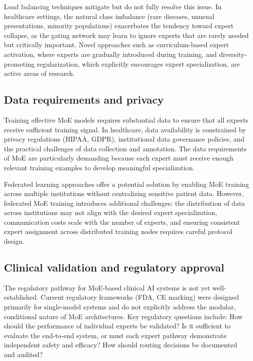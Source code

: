 Load balancing techniques \cite{fedus2022switch} mitigate but do not fully resolve this issue. In healthcare settings, the natural class imbalance (rare diseases, unusual presentations, minority populations) exacerbates the tendency toward expert collapse, as the gating network may learn to ignore experts that are rarely needed but critically important. Novel approaches such as curriculum-based expert activation, where experts are gradually introduced during training, and diversity-promoting regularization, which explicitly encourages expert specialization, are active areas of research.

\subsection*{Data requirements and privacy}

Training effective MoE models requires substantial data to ensure that all experts receive sufficient training signal. In healthcare, data availability is constrained by privacy regulations (HIPAA, GDPR), institutional data governance policies, and the practical challenges of data collection and annotation. The data requirements of MoE are particularly demanding because each expert must receive enough relevant training examples to develop meaningful specialization.

Federated learning approaches offer a potential solution by enabling MoE training across multiple institutions without centralizing sensitive patient data. However, federated MoE training introduces additional challenges: the distribution of data across institutions may not align with the desired expert specialization, communication costs scale with the number of experts, and ensuring consistent expert assignment across distributed training nodes requires careful protocol design.

\subsection*{Clinical validation and regulatory approval}

The regulatory pathway for MoE-based clinical AI systems is not yet well-established. Current regulatory frameworks (FDA, CE marking) were designed primarily for single-model systems and do not explicitly address the modular, conditional nature of MoE architectures. Key regulatory questions include: How should the performance of individual experts be validated? Is it sufficient to evaluate the end-to-end system, or must each expert pathway demonstrate independent safety and efficacy? How should routing decisions be documented and audited?

